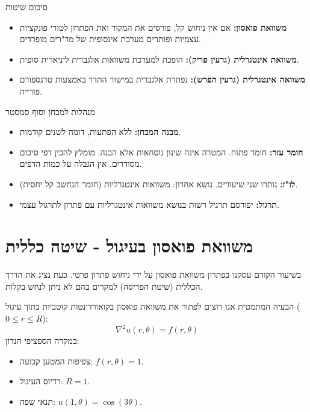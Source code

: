 \begin{summarybox}{סיכום שיטות}
\begin{itemize}
    \item \textbf{משוואת פואסון:} אם אין ניחוש קל, פורסים את המקור ואת הפתרון לטורי פונקציות עצמיות ופותרים מערכת אינסופית של מד"רים מופרדים.
    \item \textbf{משוואת אינטגרלית (גרעין פריק):} הופכת למערכת משוואות אלגברית ליניארית סופית.
    \item \textbf{משוואה אינטגרלית (גרעין הפרש):} נפתרת אלגברית במישור התדר באמצעות טרנספורם פורייה.
\end{itemize}
\end{summarybox}









\maketitle

\begin{summarybox}{מנהלות למבחן וסוף סמסטר}
\begin{itemize}
    \item \textbf{מבנה המבחן:} ללא הפתעות, דומה לשנים קודמות.
    \item \textbf{חומר עזר:} חומר פתוח. המטרה אינה שינון נוסחאות אלא הבנה. מומלץ להכין דפי סיכום מסודרים. אין הגבלה על כמות הדפים.
    \item \textbf{לו"ז:} נותרו שני שיעורים. נושא אחרון: משוואות אינטגרליות (חומר הנחשב קל יחסית).
    \item \textbf{תרגול:} יפורסם תרגיל רשות בנושא משוואות אינטגרליות עם פתרון לתרגול עצמי.
\end{itemize}
\end{summarybox}

\section{משוואת פואסון בעיגול - שיטה כללית}

בשיעור הקודם עסקנו בפתרון משוואת פואסון על ידי ניחוש פתרון פרטי. כעת נציג את הדרך הכללית (שיטת הפריסה) למקרים בהם לא ניתן לנחש בקלות.

\begin{mainbox}{הבעיה המתמטית}
אנו רוצים לפתור את משוואת פואסון בקואורדינטות קוטביות בתוך עיגול ($0 \le r \le R$):
$$ \nabla^2 u(r, \theta) = f(r, \theta) $$
במקרה הספציפי הנדון:
\begin{itemize}
    \item צפיפות המטען קבועה: $f(r, \theta) = 1$.
    \item רדיוס העיגול: $R=1$.
    \item תנאי שפה: $u(1, \theta) = \cos(3\theta)$.
\end{itemize}
\end{mainbox}

